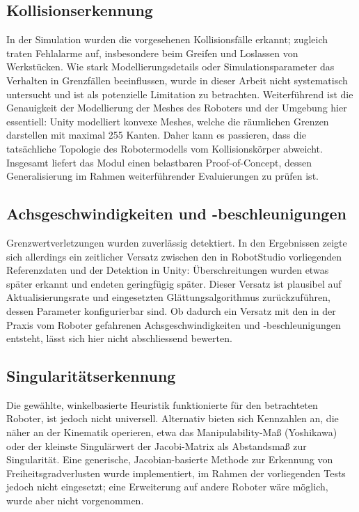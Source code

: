 \subsection{Kollisionserkennung}

In der Simulation wurden die vorgesehenen Kollisionsfälle erkannt; zugleich
traten Fehlalarme auf, insbesondere beim Greifen und Loslassen von Werkstücken.
Wie stark Modellierungsdetails oder Simulationsparameter das Verhalten in
Grenzfällen beeinflussen, wurde in dieser Arbeit nicht systematisch untersucht
und ist als potenzielle Limitation zu betrachten. Weiterführend ist die
Genauigkeit der Modellierung der Meshes des Roboters und der Umgebung hier
essentiell: Unity modelliert konvexe Meshes, welche die räumlichen Grenzen
darstellen mit maximal 255 Kanten. Daher kann es passieren, dass die
tatsächliche Topologie des Robotermodells vom Kollisionskörper abweicht.
Insgesamt liefert das Modul einen belastbaren Proof-of-Concept, dessen
Generalisierung im Rahmen weiterführender Evaluierungen zu prüfen ist.

\subsection{Achsgeschwindigkeiten und -beschleunigungen}

Grenzwertverletzungen wurden zuverlässig detektiert. In den Ergebnissen zeigte
sich allerdings ein zeitlicher Versatz zwischen den in RobotStudio vorliegenden
Referenzdaten und der Detektion in Unity: Überschreitungen wurden etwas später
erkannt und endeten geringfügig später. Dieser Versatz ist plausibel auf
Aktualisierungsrate und eingesetzten Glättungsalgorithmus zurückzuführen, dessen
Parameter konfigurierbar sind. Ob dadurch ein Versatz mit den in der Praxis
vom Roboter gefahrenen Achsgeschwindigkeiten und -beschleunigungen
entsteht, lässt sich hier
nicht abschliessend bewerten.

\subsection{Singularitätserkennung}

Die gewählte, winkelbasierte Heuristik funktionierte für den betrachteten
Roboter, ist jedoch nicht universell. Alternativ bieten sich Kennzahlen an, die
näher an der Kinematik operieren, etwa das Manipulability-Maß (Yoshikawa) oder
der kleinste Singulärwert der Jacobi-Matrix als Abstandsmaß zur Singularität.
Eine generische, Jacobian-basierte Methode zur Erkennung von
Freiheitsgradverlusten wurde implementiert, im Rahmen der vorliegenden Tests
jedoch nicht eingesetzt; eine Erweiterung auf andere Roboter wäre möglich, wurde
aber nicht vorgenommen.

